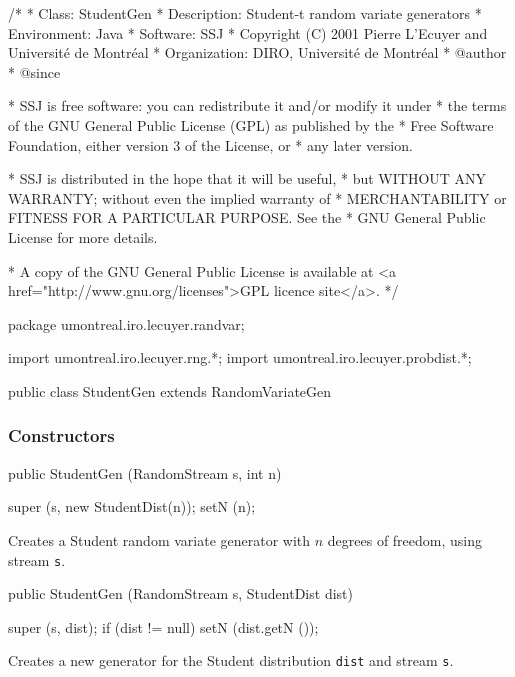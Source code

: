 \begin{code}
\begin{hide}
/*
 * Class:        StudentGen
 * Description:  Student-t random variate generators 
 * Environment:  Java
 * Software:     SSJ 
 * Copyright (C) 2001  Pierre L'Ecuyer and Université de Montréal
 * Organization: DIRO, Université de Montréal
 * @author       
 * @since

 * SSJ is free software: you can redistribute it and/or modify it under
 * the terms of the GNU General Public License (GPL) as published by the
 * Free Software Foundation, either version 3 of the License, or
 * any later version.

 * SSJ is distributed in the hope that it will be useful,
 * but WITHOUT ANY WARRANTY; without even the implied warranty of
 * MERCHANTABILITY or FITNESS FOR A PARTICULAR PURPOSE.  See the
 * GNU General Public License for more details.

 * A copy of the GNU General Public License is available at
   <a href="http://www.gnu.org/licenses">GPL licence site</a>.
 */
\end{hide}
package umontreal.iro.lecuyer.randvar;\begin{hide}
import umontreal.iro.lecuyer.rng.*;
import umontreal.iro.lecuyer.probdist.*;
\end{hide}

public class StudentGen extends RandomVariateGen \begin{hide} {
   protected int n = -1;
\end{hide}\end{code}

\subsubsection* {Constructors}
\begin{code}

   public StudentGen (RandomStream s, int n) \begin{hide} {
      super (s, new StudentDist(n));
      setN (n);
   }\end{hide}
\end{code}
\begin{tabb}  Creates a Student random variate generator with
 $n$ degrees of freedom, using stream \texttt{s}.
\end{tabb}
\begin{code}

   public StudentGen (RandomStream s, StudentDist dist) \begin{hide} {
      super (s, dist);
      if (dist != null)
         setN (dist.getN ());
   }\end{hide}
\end{code}
 \begin{tabb} Creates a new generator for the Student distribution \texttt{dist}
     and stream \texttt{s}.
 \end{tabb}

